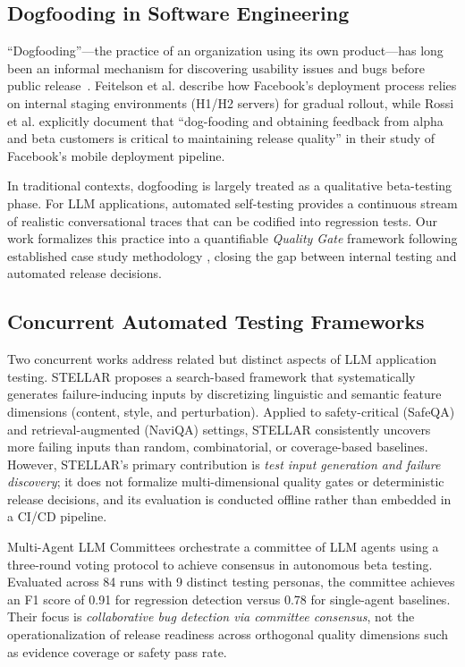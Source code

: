 \subsection{Dogfooding in Software Engineering}
``Dogfooding''---the practice of an organization using its own product---has long been an informal mechanism for discovering usability issues and bugs before public release~\cite{harrison2006dogfooding}. Feitelson et al. \cite{feitelson2013facebook} describe how Facebook's deployment process relies on internal staging environments (H1/H2 servers) for gradual rollout, while Rossi et al. \cite{rossi2016facebook} explicitly document that ``dog-fooding and obtaining feedback from alpha and beta customers is critical to maintaining release quality'' in their study of Facebook's mobile deployment pipeline.

In traditional contexts, dogfooding is largely treated as a qualitative beta-testing phase. For LLM applications, automated self-testing provides a continuous stream of realistic conversational traces that can be codified into regression tests. Our work formalizes this practice into a quantifiable \textit{Quality Gate} framework following established case study methodology \cite{runeson2009guidelines, basili1994gqm}, closing the gap between internal testing and automated release decisions.

\subsection{Concurrent Automated Testing Frameworks}
\label{sec:concurrent}

Two concurrent works address related but distinct aspects of LLM application testing. STELLAR \cite{sorokin2026stellar} proposes a search-based framework that systematically generates failure-inducing inputs by discretizing linguistic and semantic feature dimensions (content, style, and perturbation). Applied to safety-critical (SafeQA) and retrieval-augmented (NaviQA) settings, STELLAR consistently uncovers more failing inputs than random, combinatorial, or coverage-based baselines. However, STELLAR's primary contribution is \emph{test input generation and failure discovery}; it does not formalize multi-dimensional quality gates or deterministic release decisions, and its evaluation is conducted offline rather than embedded in a CI/CD pipeline.

Multi-Agent LLM Committees \cite{karanam2025committees} orchestrate a committee of LLM agents using a three-round voting protocol to achieve consensus in autonomous beta testing. Evaluated across 84 runs with 9 distinct testing personas, the committee achieves an F1 score of 0.91 for regression detection versus 0.78 for single-agent baselines. Their focus is \emph{collaborative bug detection via committee consensus}, not the operationalization of release readiness across orthogonal quality dimensions such as evidence coverage or safety pass rate.

